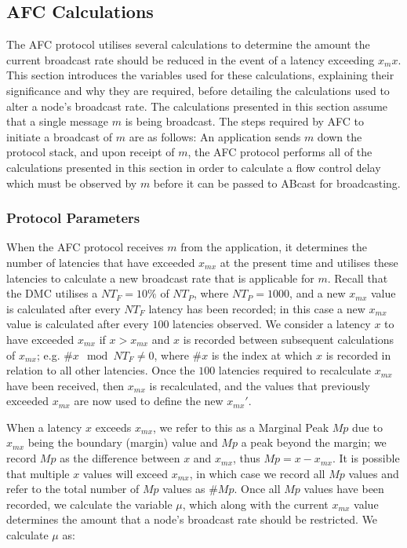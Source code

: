     \subsection*{AFC Calculations}        
    The AFC protocol utilises several calculations to determine the amount the current broadcast rate should be reduced in the event of a latency exceeding $x_mx$.  This section introduces the variables used for these calculations, explaining their significance and why they are required, before detailing the calculations used to alter a node's broadcast rate.  The calculations presented in this section assume that a single message $m$ is being broadcast.  The steps required by AFC to initiate a broadcast of $m$ are as follows: An application sends $m$ down the protocol stack, and upon receipt of $m$, the AFC protocol performs all of the calculations presented in this section in order to calculate a flow control delay which must be observed by $m$ before it can be passed to \textsf{ABcast} for broadcasting.  
   
   \subsubsection*{Protocol Parameters}
   When the AFC protocol receives $m$ from the application, it determines the number of latencies that have exceeded $x_{mx}$ at the present time and utilises these latencies to calculate a new broadcast rate that is applicable for $m$.  Recall that the DMC utilises a $NT_F = 10\%$ of $NT_P$, where $NT_P = 1000$, and a new $x_{mx}$ value is calculated after every $NT_F$ latency has been recorded; in this case a new $x_{mx}$ value is calculated after every $100$ latencies observed.    We consider a latency $x$ to have exceeded $x_{mx}$ if $x > x_{mx}$ and $x$ is recorded between subsequent calculations of $x_{mx}$; e.g. $\#x \mod NT_F \neq 0$, where $\#x$ is the index at which $x$ is recorded in relation to all other latencies.  Once the $100$ latencies required to recalculate $x_{mx}$ have been received, then $x_{mx}$ is recalculated, and the values that previously exceeded $x_{mx}$ are now used to define the new $x_{mx}'$. 
    
    When a latency $x$ exceeds $x_{mx}$, we refer to this as a Marginal Peak $Mp$ due to $x_{mx}$ being the boundary (margin) value and $Mp$ a peak beyond the margin; we record $Mp$ as the difference between $x$ and $x_{mx}$, thus $Mp = x - x_{mx}$.  It is possible that multiple $x$ values will exceed $x_{mx}$, in which case we record all $Mp$ values and refer to the total number of $Mp$ values as $\#Mp$.   Once all $Mp$ values have been recorded, we calculate the variable $\mu$, which along with the current $x_{mx}$ value determines the amount that a node's broadcast rate should be restricted.  We calculate $\mu$ as:
    
